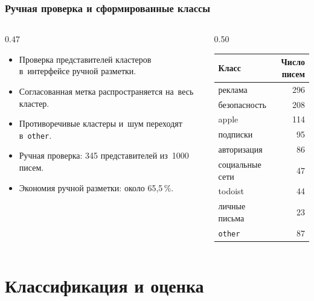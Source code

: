 \begin{frame}
    \frametitle{Ручная проверка и сформированные классы}
    \begin{columns}[T,onlytextwidth]
        \begin{column}{0.47\linewidth}
            \small
            \begin{itemize}
                \item Проверка представителей кластеров
                      в~интерфейсе ручной разметки.
                \item Согласованная метка распространяется на~весь кластер.
                \item Противоречивые кластеры и~шум переходят в~\texttt{other}.
                \item Ручная проверка: 345 представителей из~1000 писем.
                \item Экономия ручной разметки: около 65{,}5\,\%.
            \end{itemize}
        \end{column}
        \begin{column}{0.50\linewidth}
            \scriptsize
            \begin{tabular}{@{}lr@{}}
                \toprule
                Класс & Число писем \\
                \midrule
                реклама & 296 \\
                безопасность & 208 \\
                apple & 114 \\
                подписки & 95 \\
                авторизация & 86 \\
                социальные сети & 47 \\
                todoist & 44 \\
                личные письма & 23 \\
                \texttt{other} & 87 \\
                \bottomrule
            \end{tabular}
        \end{column}
    \end{columns}
\end{frame}

\section{Классификация и оценка}

